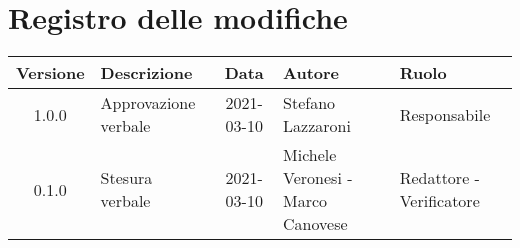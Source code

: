 \section*{Registro delle modifiche}

\begin{center}
	\begin{longtable}{|c|p{4cm}|c|p{3cm}|p{3cm}|}
		\hline
		\rowcolor{lighter-grayer}
		\textbf{Versione} & \textbf{Descrizione} & \textbf{Data} & \textbf{Autore} & \textbf{Ruolo} \\
		\hline
		\endfirsthead

		\hline
		1.0.0 & Approvazione verbale & 2021-03-10 & Stefano Lazzaroni & Responsabile \\
		0.1.0 & Stesura verbale & 2021-03-10 & Michele Veronesi - Marco Canovese & Redattore - Verificatore \\
		\hline
	\end{longtable}
\end{center}